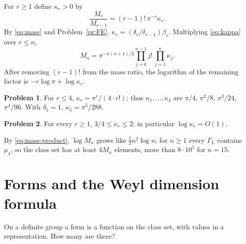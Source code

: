 \documentclass[reqno]{amsart}
\theoremstyle{definition}
\newtheorem{problem}{Problem}[section]
\theoremstyle{plain}
\begin{document}
For \(r \ge 1\) define \(\kappa_r > 0\) by
\begin{equation}\label{eq:kappa}
  \frac{M_r}{M_{r-1}} = (r-1)!\, \pi^{-r} \kappa_r .
\end{equation}
By \eqref{eq:mass} and Problem~\ref{pr:FE}, \(\kappa_r = (\delta_r/\delta_{r-1})\beta_r\).  Multiplying \eqref{eq:kappa} over \(r \le n\),
\begin{equation}\label{eq:mass-product}
  M_n = \pi^{-n(n+1)/2} \prod_{j=0}^{n-1} j! \, \prod_{j=1}^{n} \kappa_j .
\end{equation}
After removing \((r-1)!\) from the mass ratio, the logarithm of the remaining factor is \(-r\log\pi+\log\kappa_r\).

\begin{problem}\label{pr:kappa}
For \(r \le 4\), \(\kappa_r = \pi^r/(4 \cdot r!)\); thus \(\kappa_1, \dots, \kappa_4\) are \(\pi/4\), \(\pi^2/8\), \(\pi^3/24\), \(\pi^4/96\).  With \(\delta_5 = 1\), \(\kappa_5 = \pi^5/288\).
\end{problem}

\begin{problem}\label{pr:kappa-bound}
For every \(r \ge 1\), \(3/4 \le \kappa_r \le 2\); in particular \(\log \kappa_r = O(1)\).
\end{problem}

  By \eqref{eq:mass-product}, \(\log M_n\) grows like \(\tfrac12 n^2 \log n\); for \(n \ge 1\) every \(\Gamma_L\) contains \(\mu_4\), so the class set has at least \(4M_n\) elements, more than \(8 \cdot 10^5\) for \(n = 15\).

\section{Forms and the Weyl dimension formula}\label{sec:forms}

On a definite group a form is a function on the class set, with values in a representation.  How many are there?
\end{document}
